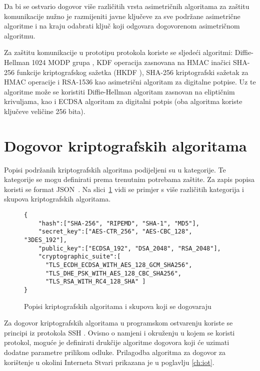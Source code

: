 Da bi se ostvario dogovor više različitih vrsta asimetričnih algoritama za zaštitu
komunikacije nužno je razmijeniti javne ključeve za sve podržane
asimetrične algoritme i na kraju odabrati ključ koji odgovara dogovorenom
asimetričnom algoritmu.

Za zaštitu komunikacije u prototipu protokola koriste se sljedeći algoritmi:
Diffie-Hellman 1024 MODP grupa \cite{rfc5114}, KDF operacija zasnovana na HMAC
inačici SHA-256 funkcije kriptografskog sažetka (HKDF \cite{rfc5869}), SHA-256
kriptografski sažetak za HMAC operacije i RSA-1536 kao asimetrični algoritam za
digitalne potpise. Uz te algoritme može se koristiti Diffie-Hellman
algoritam zasnovan na eliptičnim krivuljama, kao i ECDSA algoritam za digitalni
potpis (oba algoritma koriste ključeve veličine 256 bita).

\section{Dogovor kriptografskih algoritama}
\label{sec:dogovor}

Popisi podržanih kriptografskih algoritma podijeljeni su u kategorije. Te
kategorije se mogu definirati prema trenutnim potrebama zaštite. Za zapis
popisa koristi se format JSON~\cite{rfc4627}.
Na slici~\ref{fig:alg_list} vidi se primjer s više različitih kategorija i
skupova kriptografskih algoritama.
\begin{figure}[htb]
\begin{small}
\begin{verbatim}
{
    "hash":["SHA-256", "RIPEMD", "SHA-1", "MD5"],
    "secret_key":["AES-CTR_256", "AES-CBC_128", "3DES_192"],
    "public_key":["ECDSA_192", "DSA_2048", "RSA_2048"],
    "cryptographic_suite":[
      "TLS_ECDH_ECDSA_WITH_AES_128_GCM_SHA256",
      "TLS_DHE_PSK_WITH_AES_128_CBC_SHA256",
      "TLS_RSA_WITH_RC4_128_SHA" ]
}
\end{verbatim}
\end{small}
\vspace{-15pt}
\caption{Popisi kriptografskih algoritama i skupova koji se dogovaraju}
\label{fig:alg_list}
\end{figure}


Za dogovor kriptografskih algoritama u programskom ostvarenju koriste se principi iz
protokola SSH \cite{rfc4253}. Ovisno o
namjeni i okruženju u kojem se koristi protokol, moguće je definirati drukčije
algoritme dogovora koji će uzimati dodatne parametre prilikom odluke.
Prilagodba algoritma za dogovor za korištenje u okolini Interneta Stvari
prikazana je u poglavlju \ref{ch:iot}.

